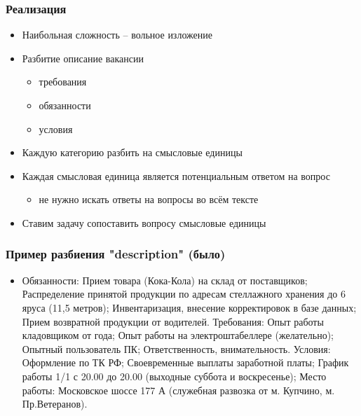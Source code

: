 \documentclass[xcolor=table,xetex,mathserif,serif]{beamer}
\begin{document}
\begin{frame}
	\frametitle{Реализация}

	\begin{itemize}
		\item Наибольная сложность -- вольное изложение
		\item Разбитие описание вакансии
		      \begin{itemize}
			      \item требования
			      \item обязанности
			      \item условия
		      \end{itemize}
		\item Каждую категорию разбить на смысловые единицы
		\item Каждая смысловая единица является потенциальным ответом на вопрос
		      \begin{itemize}
			      \item не нужно искать ответы на вопросы во всём тексте
		      \end{itemize}
		\item Ставим задачу сопоставить вопросу смысловые единицы
	\end{itemize}
\end{frame}


\begin{frame}
	\frametitle{Пример разбиения "description" (было)}

	\begin{itemize}
		\item Обязанности:  Прием товара (Кока-Кола) на склад от поставщиков; Распределение принятой продукции по адресам стеллажного хранения до 6 яруса (11,5 метров); Инвентаризация, внесение корректировок в базе данных; Прием возвратной продукции от водителей.    Требования:  Опыт работы кладовщиком от года; Опыт работы на электроштабеллере (желательно); Опытный пользователь ПК; Ответственность, внимательность.    Условия:  Оформление по ТК РФ; Своевременные выплаты заработной платы; График работы 1/1 с 20.00 до 20.00 (выходные суббота и воскресенье); Место работы: Московское шоссе 177 А (служебная развозка от м. Купчино, м. Пр.Ветеранов).
	\end{itemize}
\end{frame}
\end{document}
